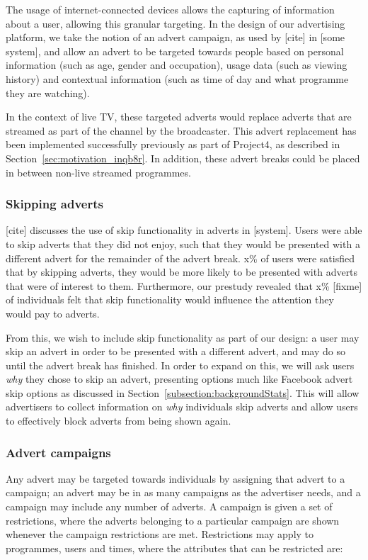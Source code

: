 	The usage of internet-connected devices allows the capturing of information about a user, allowing this granular targeting. In the design of our advertising platform, we take the notion of an advert campaign, as used by [cite] in [some system], and allow an advert to be targeted towards people based on personal information (such as age, gender and occupation), usage data (such as viewing history) and contextual information (such as time of day and what programme they are watching).

	In the context of live TV, these targeted adverts would replace adverts that are streamed as part of the channel by the broadcaster. This advert replacement has been implemented successfully previously as part of Project4, as described in Section~\ref{sec:motivation_inqb8r}. In addition, these advert breaks could be placed in between non-live streamed programmes.

	\subsubsection{Skipping adverts}

	[cite] discusses the use of skip functionality in adverts in [system]. Users were able to skip adverts that they did not enjoy, such that they would be presented with a different advert for the remainder of the advert break. x\% of users were satisfied that by skipping adverts, they would be more likely to be presented with adverts that were of interest to them. Furthermore, our prestudy revealed that x\% [fixme] of individuals felt that skip functionality would influence the attention they would pay to adverts.

	From this, we wish to include skip functionality as part of our design: a user may skip an advert in order to be presented with a different advert, and may do so until the advert break has finished. In order to expand on this, we will ask users \textit{why} they chose to skip an advert, presenting options much like Facebook advert skip options as discussed in Section~\ref{subsection:backgroundStats}. This will allow advertisers to collect information on \textit{why} individuals skip adverts and allow users to effectively block adverts from being shown again.

	\subsubsection{Advert campaigns}

	Any advert may be targeted towards individuals by assigning that advert to a campaign; an advert may be in as many campaigns as the advertiser needs, and a campaign may include any number of adverts. A campaign is given a set of restrictions, where the adverts belonging to a particular campaign are shown whenever the campaign restrictions are met. Restrictions may apply to programmes, users and times, where the attributes that can be restricted are:

